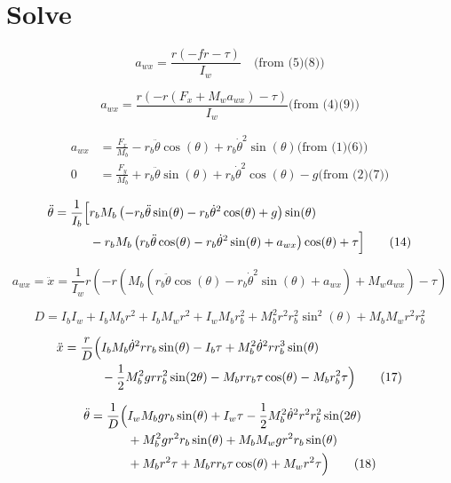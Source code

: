 \documentclass[12pt]{article}
\begin{document}
\section*{Solve}
\[
a_{wx} = \frac{r(-fr - \tau)}{I_w} \quad \text{(from (5)(8))} \tag{9}
\]

\[
a_{wx} = \frac{r(-r(F_x+M_wa_{wx})-\tau)}{I_w}\text{(from (4)(9))} \tag{10}
\]

\begin{align}
a_{wx} &= \frac{F_x}{M_b} - r_b \ddot{\theta} \cos(\theta) + r_b \dot{\theta}^2 \sin(\theta)\text{(from (1)(6))} \tag{11} \\
0 &= \frac{F_y}{M_b} + r_b \ddot{\theta} \sin(\theta) + r_b \dot{\theta}^2 \cos(\theta) - g \text{(from (2)(7))}\tag{12}
\end{align}

\begin{align}
\ddot{\theta} = \frac{1}{I_b} \Big[ 
    & r_b M_b \left( 
        -r_b \ddot{\theta} \sin(\theta) 
        - r_b \dot{\theta}^2 \cos(\theta) 
        + g 
    \right) \sin(\theta) \notag \\
    & - r_b M_b \left( 
        r_b \ddot{\theta} \cos(\theta) 
        - r_b \dot{\theta}^2 \sin(\theta) 
        + a_{wx} 
    \right) \cos(\theta) 
    + \tau 
\Big] 
\tag{14}
\end{align}

\[
a_{wx} = \ddot{x} = \frac{1}{I_w}{r \left( 
    -r \left( 
        M_b \left( 
            r_b \ddot{\theta} \cos(\theta) 
            - r_b \dot{\theta}^2 \sin(\theta) 
            + a_{wx} 
        \right) 
        + M_w a_{wx} 
    \right) 
    - \tau 
\right)}
\tag{15}
\]

\[
D = I_b I_w + I_b M_b r^2 + I_b M_w r^2 + I_w M_b r_b^2 + M_b^2 r^2 r_b^2 \sin^2(\theta) + M_b M_w r^2 r_b^2
\tag{16}
\]


\begin{align}
\ddot{x} = \frac{r}{D} \Big( 
    & I_b M_b \dot{\theta}^2 r r_b \sin(\theta)
    - I_b \tau 
    + M_b^2 \dot{\theta}^2 r r_b^3 \sin(\theta) \notag \\
    & - \frac{1}{2} M_b^2 g r r_b^2 \sin(2\theta)
    - M_b r r_b \tau \cos(\theta)
    - M_b r_b^2 \tau 
\Big)
\tag{17}
\end{align}

\begin{align}
\ddot{\theta} = \frac{1}{D} \Big( 
    & I_w M_b g r_b \sin(\theta)
    + I_w \tau 
    - \frac{1}{2} M_b^2 \dot{\theta}^2 r^2 r_b^2 \sin(2\theta) \notag \\
    & + M_b^2 g r^2 r_b \sin(\theta)
    + M_b M_w g r^2 r_b \sin(\theta) \notag \\
    & + M_b r^2 \tau
    + M_b r r_b \tau \cos(\theta)
    + M_w r^2 \tau 
\Big)
\tag{18}
\end{align}
\end{document}
